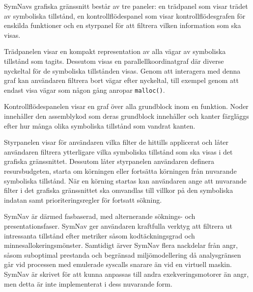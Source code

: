 SymNavs grafiska gränssnitt består av tre paneler: en trädpanel som visar trädet
av symboliska tillstånd, en kontrollflödespanel som visar kontrollflödesgrafen
för enskilda funktioner och en styrpanel för att filtrera vilken information som
ska visas.

Trädpanelen visar en kompakt representation av alla vägar av symboliska
tillstånd som tagits. Dessutom visas en parallellkoordinatgraf där diverse
nyckeltal för de symboliska tillstånden visas. Genom att interagera med denna
graf kan användaren filtrera bort vägar efter nyckeltal, till exempel genom att
endast visa vägar som någon gång anropar \verb|malloc()|.

Kontrollflödespanelen visar en graf över alla grundblock inom en funktion. Noder
innehåller den assemblykod som deras grundblock innehåller och kanter färgläggs
efter hur många olika symboliska tillstånd som vandrat kanten.

Styrpanelen visar för användaren vilka filter de hittills applicerat och låter
användaren filtrera ytterligare vilka symboliska tillstånd som ska visas i det
grafiska gränssnittet. Dessutom låter styrpanelen användaren definera
resursbudgeten, starta om körningen eller fortsätta körningen från nuvarande
symboliska tillstånd. När en körning startas kan användaren ange att nuvarande
filter i det grafiska gränssnittet ska omvandlas till villkor på den symboliska
indatan samt prioriteringsregler för fortsatt sökning.

SymNav är därmed fasbaserad, med alternerande söknings- och presentationsfaser.
SymNav ger användaren kraftfulla verktyg att filtrera ut intressanta tillstånd
efter metriker såsom kodtäckningsgrad och minnesallokeringsmönster. Samtidigt
ärver SymNav flera nackdelar från angr, såsom suboptimal prestanda
\cite{systematic_comparison_symbex} och begränsad miljömodellering då
analysgränsen går vid processen med emulerade syscalls snarare än vid en
virtuell maskin. SymNav är skrivet för att kunna anpassas till andra
exekveringsmotorer än angr, men detta är inte implementerat i dess nuvarande
form.
